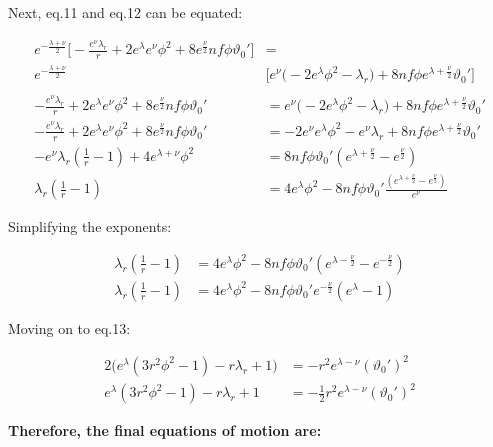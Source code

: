 \documentclass[12pt]{article}
\begin{document}
Next, eq.11 and eq.12 can be equated:

\begin{align*}
  e^{-\frac{\lambda + \nu}{2}} \Big[ - \frac{e^{\nu}\lambda_r}{r} + 2 e^{\lambda} e^{\nu} \phi^2 + 8 e^{\frac{\nu}{2}} nf\phi\vartheta_0' \Big] &= \\ e^{-\frac{\lambda + \nu}{2}} &\Big[ e^{\nu} \Big( - 2e^{\lambda}\phi^2 - \lambda_r \Big) + 8 nf \phi e^{\lambda + \frac{\nu}{2}} \vartheta_0' \Big] \\ \\
  - \frac{e^{\nu}\lambda_r}{r} + 2 e^{\lambda} e^{\nu} \phi^2 + 8 e^{\frac{\nu}{2}} nf\phi\vartheta_0' &=  e^{\nu} \Big( - 2e^{\lambda}\phi^2 - \lambda_r \Big) + 8 nf \phi e^{\lambda + \frac{\nu}{2}} \vartheta_0' \\
  - \frac{e^{\nu}\lambda_r}{r} + 2 e^{\lambda} e^{\nu} \phi^2 + 8 e^{\frac{\nu}{2}} nf\phi\vartheta_0' &=  - 2e^{\nu}e^{\lambda}\phi^2 - e^{\nu}\lambda_r + 8 nf \phi e^{\lambda + \frac{\nu}{2}} \vartheta_0' \\
  -e^{\nu}\lambda_r \left(\frac{1}{r} - 1 \right) + 4 e^{\lambda + \nu}\phi^2 &= 8nf\phi\vartheta_0' \left(e^{\lambda + \frac{\nu}{2}} -  e^{\frac{\nu}{2}}\right) \\
  \lambda_r \left(\frac{1}{r} - 1 \right) &= 4 e^{\lambda}\phi^2 - 8nf\phi\vartheta_0' \frac{\left(e^{\lambda + \frac{\nu}{2}} -  e^{\frac{\nu}{2}}\right)}{e^{\nu}}
\end{align*}

Simplifying the exponents:

\begin{align*}
  \lambda_r \left(\frac{1}{r} - 1 \right) &= 4 e^{\lambda}\phi^2 - 8nf\phi\vartheta_0' \left(e^{\lambda - \frac{\nu}{2}} -  e^{-\frac{\nu}{2}}\right) \\
  \lambda_r \left(\frac{1}{r} - 1 \right) &= 4 e^{\lambda}\phi^2 - 8nf\phi\vartheta_0' e^{-\frac{\nu}{2}}\left(e^{\lambda} -  1\right)
\end{align*}

Moving on to eq.13:

\begin{align*}
  2 \Big( e^{\lambda}(3r^2\phi^2 - 1) - r\lambda_r + 1 \Big) &= - r^2 e^{\lambda-\nu} (\vartheta_0')^2 \\
  e^{\lambda}(3r^2\phi^2 - 1) - r\lambda_r + 1 &= - \frac{1}{2} r^2 e^{\lambda-\nu} (\vartheta_0')^2
\end{align*}

\textbf{Therefore, the final equations of motion are:}
\end{document}
